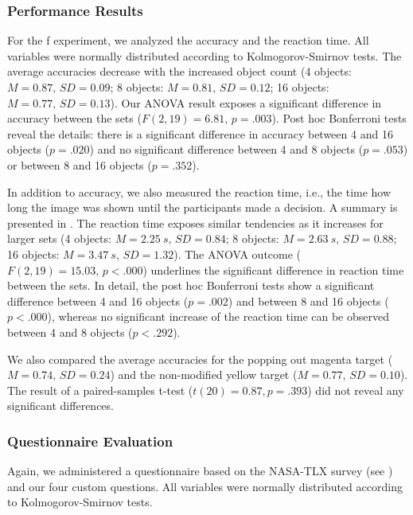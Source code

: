 \documentclass[journal]{vgtc}                %
\begin{document}
\subsubsection{Performance Results}

For the f experiment, we analyzed the accuracy and the reaction time. All variables were normally distributed according to Kolmogorov-Smirnov tests. The average accuracies decrease with the increased object count (4 objects: $M = 0.87,\,SD = 0.09$; 8 objects: $M = 0.81,\,SD = 0.12$; 16 objects: $M = 0.77,\,SD = 0.13$). Our ANOVA result exposes a significant difference in accuracy between the sets ($F(2,19) = 6.81,\,p = .003$). Post hoc Bonferroni tests reveal the details: there is a significant difference in accuracy between 4 and 16 objects ($p = .020$) and no significant difference between 4 and 8 objects ($p = .053$) or between 8 and 16 objects ($p = .352$).

In addition to accuracy, we also measured the reaction time, i.e., the time how long the image was shown until the participants made a decision. A summary is presented in . The reaction time exposes similar tendencies as it increases for larger sets (4 objects: $M = 2.25~s,\,SD = 0.84$; 8 objects: $M = 2.63~s,\,SD = 0.88$; 16 objects: $M = 3.47~s,\,SD = 1.32$). The ANOVA outcome ($F(2,19) = 15.03,\,p < .000$) underlines the significant difference in reaction time between the sets. In detail, the post hoc Bonferroni tests show a significant difference between 4 and 16 objects ($p = .002$) and between 8 and 16 objects ($p < .000$), whereas no significant increase of the reaction time can be observed between 4 and 8 objects ($p < .292$).

We also compared the average accuracies for the popping out magenta target ($M = 0.74,\,SD = 0.24$) and the non-modified yellow target ($M = 0.77,\,SD = 0.10$). The result of a paired-samples t-test ($t(20) = 0.87, p = .393$) did not reveal any significant differences.

\subsubsection{Questionnaire Evaluation}

Again, we administered a questionnaire based on the NASA-TLX survey (see ) and our four custom questions. All variables were normally distributed according to Kolmogorov-Smirnov tests. 

\end{document}
